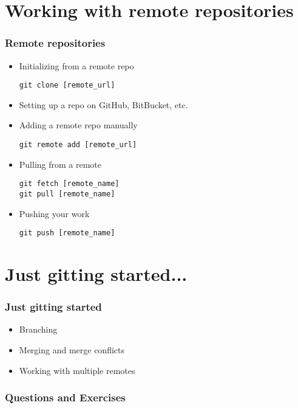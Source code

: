 \documentclass[10pt,t,sans,mathsans,xcolor=dvipsnames]{beamer}
\begin{document}
\section{Working with remote repositories}
\begin{frame}
\frametitle{Remote repositories}
\begin{itemize}
\item Initializing from a remote repo
\begin{lstlisting}
git clone [remote_url]
\end{lstlisting}
\item Setting up a repo on GitHub, BitBucket, etc.
\item Adding a remote repo manually
\begin{lstlisting}
git remote add [remote_url]
\end{lstlisting}
\item Pulling from a remote
\begin{lstlisting}
git fetch [remote_name]
git pull [remote_name]
\end{lstlisting}
\item Pushing your work
\begin{lstlisting}
git push [remote_name]
\end{lstlisting}
\end{itemize}
\end{frame}
\section{Just gitting started...}
\begin{frame}[fragile]%
\frametitle{Just gitting started}
\begin{itemize}
\item Branching
\item Merging and merge conflicts
\item Working with multiple remotes
\end{itemize}
\end{frame}
\begin{frame}
\frametitle{Questions and Exercises}
\end{frame}
\end{document}
